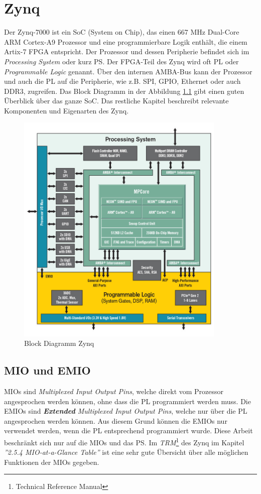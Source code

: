 
\chapter{Zynq}
Der Zynq-7000 ist ein SoC (System on Chip), das einen 667 MHz Dual-Core ARM Cortex-A9 Prozessor und eine programmierbare Logik enthält, die einem Artix-7 FPGA entspricht.
Der Prozessor und dessen Peripherie befindet sich im \textit{Processing System} oder kurz PS.
Der FPGA-Teil des Zynq wird oft PL oder \textit{Programmable Logic} genannt.
Über den internen AMBA-Bus kann der Prozessor und auch die PL auf die Peripherie, wie z.B. SPI, GPIO, Ethernet oder auch DDR3, zugreifen.
Das Block Diagramm in der Abbildung \ref{fig:BlockDiagrammZynq} gibt einen guten Überblick über das ganze SoC.
Das restliche Kapitel beschreibt relevante Komponenten und Eigenarten des Zynq.

\begin{figure}[htbp]
	\centering
		\includegraphics[width=10cm,height=\textheight,keepaspectratio]{images/zynqBlockDiagram.png}
	\caption[Block Diagramm Zynq]{Block Diagramm Zynq\footnotemark}
	\label{fig:BlockDiagrammZynq}
\end{figure}


\section{MIO und EMIO}
MIOs sind \textit{Multiplexed Input Output Pins}, welche direkt vom Prozessor angesprochen werden können, ohne dass die PL programmiert werden muss.
Die EMIOs sind \textit{\textbf{Extended} Multiplexed Input Output Pins}, welche nur über die PL angesprochen werden können.
Aus diesem Grund können die EMIOs nur verwendet werden, wenn die PL entsprechend programmiert wurde.
Diese Arbeit beschränkt sich nur auf die MIOs und das PS.
Im \textit{TRM}\footnote{Technical Reference Manual} des Zynq\cite{bib:ZynqTechnicalReferenceManual} im Kapitel \textit{''2.5.4 MIO-at-a-Glance Table''} ist eine sehr gute Übersicht über alle möglichen Funktionen der MIOs gegeben.

